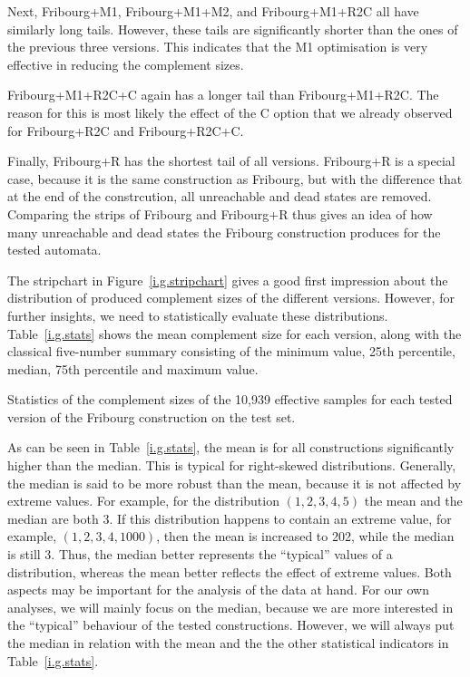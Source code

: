Next, Fribourg+M1, Fribourg+M1+M2, and Fribourg+M1+R2C all have similarly long tails. However, these tails are significantly shorter than the ones of the previous three versions. This indicates that the M1 optimisation is very effective in reducing the complement sizes.

Fribourg+M1+R2C+C again has a longer tail than Fribourg+M1+R2C. The reason for this is most likely the effect of the C option that we already observed for Fribourg+R2C and Fribourg+R2C+C.

Finally, Fribourg+R has the shortest tail of all versions. Fribourg+R is a special case, because it is the same construction as Fribourg, but with the difference that at the end of the constrcution, all unreachable and dead states are removed. Comparing the strips of Fribourg and Fribourg+R thus gives an idea of how many unreachable and dead states the Fribourg construction produces for the tested automata.

The stripchart in Figure~\ref{i.g.stripchart} gives a good first impression about the distribution of produced complement sizes of the different versions. However, for further insights, we need to statistically evaluate these distributions. Table~\ref{i.g.stats} shows the mean complement size for each version, along with the classical five-number summary consisting of the minimum value, 25th percentile, median, 75th percentile and maximum value.

\begin{table}[ht]
\centering

\caption{Statistics of the complement sizes of the 10,939 effective samples for each tested version of the Fribourg construction on the \goal{} test set.}
\label{i.g.stats}
\end{table}

As can be seen in Table~\ref{i.g.stats}, the mean is for all constructions significantly higher than the median. This is typical for right-skewed distributions. Generally, the median is said to be more robust than the mean, because it is not affected by extreme values. For example, for the distribution $(1,2,3,4,5)$ the mean and the median are both 3. If this distribution happens to contain an extreme value, for example, $(1,2,3,4,1000)$, then the mean is increased to 202, while the median is still 3. Thus, the median better represents the ``typical'' values of a distribution, whereas the mean better reflects the effect of extreme values. Both aspects may be important for the analysis of the data at hand. For our own analyses, we will mainly focus on the median, because we are more interested in the ``typical'' behaviour of the tested constructions. However, we will always put the median in relation with the mean and the the other statistical indicators in Table~\ref{i.g.stats}.

